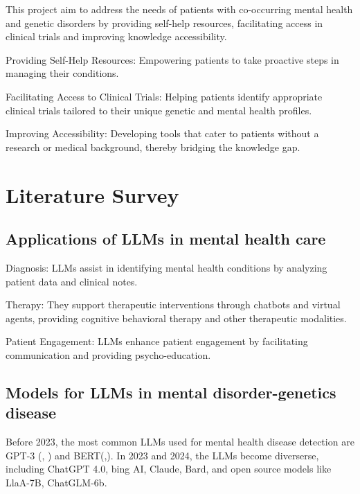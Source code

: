 \documentclass{article} %
\begin{document}
This project aim to address the needs of patients with co-occurring mental health and genetic disorders by providing self-help resources, facilitating access in clinical trials and improving knowledge accessibility.

Providing Self-Help Resources: Empowering patients to take proactive steps in managing their conditions.

Facilitating Access to Clinical Trials: Helping patients identify appropriate clinical trials tailored to their unique genetic and mental health profiles.

Improving Accessibility: Developing tools that cater to patients without a research or medical background, thereby bridging the knowledge gap.



\section{Literature Survey}

\subsection{Applications of LLMs in mental health care}

Diagnosis: LLMs assist in identifying mental health conditions by analyzing patient data and clinical notes.

Therapy: They support therapeutic interventions through chatbots and virtual agents, providing cognitive behavioral therapy and other therapeutic modalities.

Patient Engagement: LLMs enhance patient engagement by facilitating communication and providing psycho-education.

\subsection{Models for LLMs in mental disorder-genetics disease}

Before 2023, the most common LLMs used for mental health disease detection are GPT-3 (\citet{10079554}, \citet{10.1145/3544549.3585614}) and BERT(\citet{Diniz_Fontenele_de2022},\citet{Tanana_Soma_Kuo_Bertagnolli_Dembe_Pace_Srikumar_Atkins_Imel_2021}). In 2023 and 2024, the LLMs become diverserse, including ChatGPT 4.0\citep{BLEASE2024115724}, bing AI, Claude, Bard\citep{Elyoseph_Levkovich_Shinan-Altman_2024}, and open source models like LlaA-7B, ChatGLM-6b\citet{10263217}.
\end{document}
